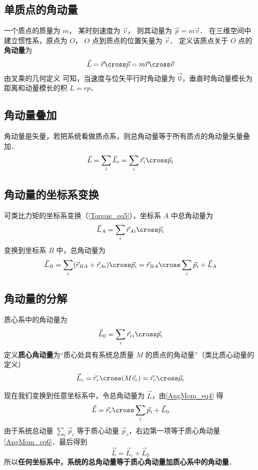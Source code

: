 

\subsection{单质点的角动量}
一个质点的质量为 $m$， 某时刻速度为 $\vec v$， 则其动量为 $\vec p = m\vec v$． 在三维空间中建立惯性系，原点为 $O$， $O$ 点到质点的位置矢量为 $\vec r$． 定义该质点关于 $O$ 点的\textbf{角动量}为
\begin{equation}
\vec L = \vec r \cross \vec p = m\vec r\cross \vec v
\end{equation}
由叉乘的几何定义 可知，当速度与位矢平行时角动量为 $\vec 0$，垂直时角动量模长为距离和动量模长的积 $L = rp$．

\subsection{角动量叠加}
角动量是矢量，若把系统看做质点系，则总角动量等于所有质点的角动量矢量叠加．
\begin{equation}
\vec L = \sum_i \vec L_i = \sum_i \vec r_i \cross\vec p_i
\end{equation}

\subsection{角动量的坐标系变换}
可类比力矩的坐标系变换（\autoref{Torque_eq5}），坐标系 $A$ 中总角动量为
\begin{equation}
\vec L_A = \sum_i \vec r_{Ai} \cross \vec p_i 
\end{equation}
变换到坐标系 $B$ 中，总角动量为
\begin{equation}\label{AngMom_eq4}
\vec L_B = \sum_i (\vec r_{BA} + \vec r_{Ai})\cross \vec p_i = \vec r_{BA}\cross \sum_i \vec p_i + \vec L_A
\end{equation}

\subsection{角动量的分解}
质心系中的角动量为
\begin{equation}\label{AngMom_eq5}
\vec L_0 = \sum_i \vec r_{ci} \cross \vec p_i
\end{equation}
定义\textbf{质心角动量}为“质心处具有系统总质量 $M$ 的质点的角动量”（类比质心动量的定义）%
\begin{equation}\label{AngMom_eq6}
\vec L_c  = \vec r_c \cross (M \vec v_c) = \vec r_c \cross \vec p_c
\end{equation}

现在我们变换到任意坐标系中，令总角动量为 $\vec L$，由\autoref{AngMom_eq4} 得
\begin{equation}
\vec L = \vec r_{c} \cross \sum_i \vec p_i + \vec L_0
\end{equation}
由于系统总动量 $\sum_i \vec p_i$ 等于质心动量 $\vec p_c$，右边第一项等于质心角动量\autoref{AngMom_eq6}．最后得到
\begin{equation}
\vec L = \vec L_c + \vec L_0
\end{equation}
所以\textbf{任何坐标系中，系统的总角动量等于质心角动量加质心系中的角动量}．
